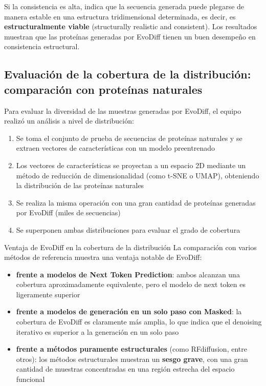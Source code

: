 \documentclass[a4paper]{article}
\begin{document}
Si la consistencia es alta, indica que la secuencia generada puede plegarse de manera estable en una estructura tridimensional determinada, es decir, es \textbf{estructuralmente viable} (structurally realistic and consistent). Los resultados muestran que las proteínas generadas por EvoDiff tienen un buen desempeño en consistencia estructural.

\subsection{Evaluación de la cobertura de la distribución: comparación con proteínas naturales}

Para evaluar la diversidad de las muestras generadas por EvoDiff, el equipo realizó un análisis a nivel de distribución:

\begin{enumerate}
    \item Se toma el conjunto de prueba de secuencias de proteínas naturales y se extraen vectores de características con un modelo preentrenado
    \item Los vectores de características se proyectan a un espacio 2D mediante un método de reducción de dimensionalidad (como t-SNE o UMAP), obteniendo la distribución de las proteínas naturales
    \item Se realiza la misma operación con una gran cantidad de proteínas generadas por EvoDiff (miles de secuencias)
    \item Se superponen ambas distribuciones para evaluar el grado de cobertura
\end{enumerate}

\begin{importantbox}{Ventaja de EvoDiff en la cobertura de la distribución}
La comparación con varios métodos de referencia muestra una ventaja notable de EvoDiff:
\begin{itemize}
    \item \textbf{frente a modelos de Next Token Prediction}: ambos alcanzan una cobertura aproximadamente equivalente, pero el modelo de next token es ligeramente superior
    \item \textbf{frente a modelos de generación en un solo paso con Masked}: la cobertura de EvoDiff es claramente más amplia, lo que indica que el denoising iterativo es superior a la generación en un solo paso
    \item \textbf{frente a métodos puramente estructurales} (como RFdiffusion, entre otros): los métodos estructurales muestran un \textbf{sesgo grave}, con una gran cantidad de muestras concentradas en una región estrecha del espacio funcional
\end{itemize}
\end{importantbox}
\end{document}
